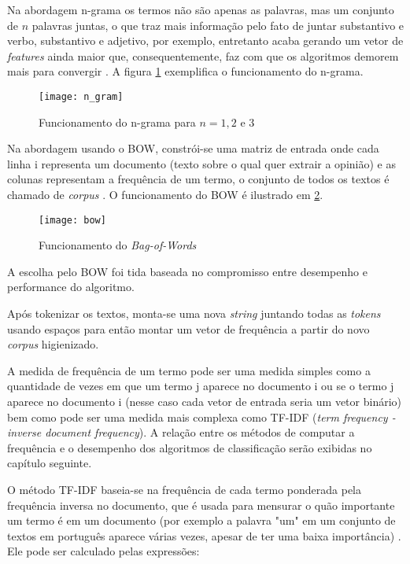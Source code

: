 Na abordagem n-grama os termos não são apenas as palavras, mas
um conjunto de $n$ palavras juntas, o que traz mais informação pelo fato de juntar substantivo e verbo, substantivo e adjetivo, por exemplo, entretanto acaba gerando um vetor de \textit{features}
ainda maior que, consequentemente, faz com que os algoritmos demorem mais para convergir \cite{ngram}. A figura 
\ref{fig:ngram} exemplifica o funcionamento do n-grama.


\begin{figure}[H]
	\centering	
	\texttt{[image: n\_gram]}
	\caption{Funcionamento do n-grama para $n = 1, 2$ e $3$}
	\label{fig:ngram}
\end{figure}

Na abordagem usando o BOW, constrói-se uma matriz de entrada onde cada linha i representa um documento 
(texto sobre o qual quer extrair a opinião) e as colunas representam a frequência de um termo, o 
conjunto de todos os textos é chamado de \textit{corpus} \cite{bow}. O funcionamento do BOW é ilustrado em \ref{fig:bow}.

\begin{figure}[H]
	\centering
	\texttt{[image: bow]}
	\caption{Funcionamento do \textit{Bag-of-Words}}
	\label{fig:bow}
\end{figure}

A escolha pelo BOW foi tida baseada no compromisso entre desempenho e performance do algoritmo.

Após tokenizar os textos, monta-se uma nova \textit{string} juntando todas as \textit{tokens} usando espaços para então montar um vetor de frequência a partir do novo \textit{corpus} higienizado.

A medida de frequência de um termo 
pode ser uma medida simples como a quantidade de vezes em que um termo j aparece no documento
i ou se o termo j aparece no documento i (nesse caso cada vetor de entrada seria um vetor binário) bem
como pode ser uma medida mais complexa como TF-IDF (\textit{term frequency - inverse document frequency}).
A relação entre os métodos de computar a frequência e o desempenho dos algoritmos de classificação serão
exibidas no capítulo seguinte.

O método TF-IDF baseia-se na frequência de cada termo ponderada pela frequência inversa no documento,
que é usada para mensurar o quão importante um termo é em um documento (por exemplo a palavra "um" em
um conjunto de textos em português aparece várias vezes, apesar de ter uma baixa importância) \cite{tf-idf}. 
Ele pode ser calculado pelas expressões:

